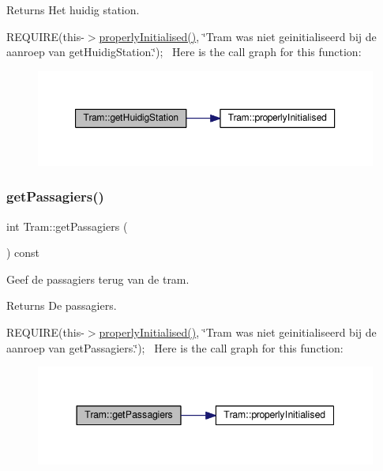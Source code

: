 \begin{DoxyReturn}{Returns}
Het huidig station.
\end{DoxyReturn}
R\+E\+Q\+U\+I\+RE(this-\/$>$\hyperlink{class_tram_ac2688f590e4db232b4f535c9bf959efb}{properly\+Initialised()}, \char`\"{}\+Tram was niet geinitialiseerd bij de aanroep van get\+Huidig\+Station.\char`\"{});~\newline
Here is the call graph for this function\+:\nopagebreak
\begin{figure}[H]
\begin{center}
\leavevmode
\includegraphics[width=350pt]{class_tram_ad04f5905ffec6ef4069b27f08c63f4b9_cgraph}
\end{center}
\end{figure}
\mbox{\label{class_tram_a678ba2cd0c6ab76e966947944f599d56}} 
\subsubsection{\texorpdfstring{get\+Passagiers()}{getPassagiers()}}
{\footnotesize\ttfamily int Tram\+::get\+Passagiers (\begin{DoxyParamCaption}{ }\end{DoxyParamCaption}) const}



Geef de passagiers terug van de tram. 

\begin{DoxyReturn}{Returns}
De passagiers.
\end{DoxyReturn}
R\+E\+Q\+U\+I\+RE(this-\/$>$\hyperlink{class_tram_ac2688f590e4db232b4f535c9bf959efb}{properly\+Initialised()}, \char`\"{}\+Tram was niet geinitialiseerd bij de aanroep van get\+Passagiers.\char`\"{});~\newline
Here is the call graph for this function\+:\nopagebreak
\begin{figure}[H]
\begin{center}
\leavevmode
\includegraphics[width=344pt]{class_tram_a678ba2cd0c6ab76e966947944f599d56_cgraph}
\end{center}
\end{figure}
\mbox{\label{class_tram_aa8bcd980469801cb8524f170006f666c}} 
